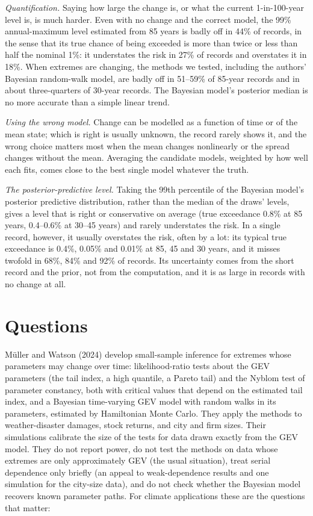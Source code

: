 \documentclass[11pt]{article}
\begin{document}
\emph{Quantification.} Saying how large the change is, or what the current 1-in-100-year level
is, is much harder. Even with no change and the correct model, the 99\% annual-maximum level
estimated from 85 years is badly off in 44\% of records, in the sense that its true chance of being
exceeded is more than twice or less than half the nominal 1\%: it understates the risk in 27\% of
records and overstates it in 18\%. When extremes are changing, the methods we tested, including the
authors' Bayesian random-walk model, are badly off in 51--59\% of 85-year records and in about
three-quarters of 30-year records. The Bayesian model's posterior median is no more accurate than a
simple linear trend.

\emph{Using the wrong model.} Change can be modelled as a function of time or of the mean state;
which is right is usually unknown, the record rarely shows it, and the wrong choice matters most
when the mean changes nonlinearly or the spread changes without the mean. Averaging the candidate
models, weighted by how well each fits, comes close to the best single model whatever the truth.

\emph{The posterior-predictive level.} Taking the 99th percentile of the Bayesian model's posterior
predictive distribution, rather than the median of the draws' levels, gives a level that is right or
conservative on average (true exceedance 0.8\% at 85 years, 0.4--0.6\% at 30--45 years) and rarely
understates the risk. In a single record, however, it usually overstates the risk, often by a lot:
its typical true exceedance is 0.4\%, 0.05\% and 0.01\% at 85, 45 and 30 years, and it misses
twofold in 68\%, 84\% and 92\% of records. Its uncertainty comes from the short record and the
prior, not from the computation, and it is as large in records with no change at all.

\setcounter{tocdepth}{1}
\tableofcontents
\newpage

\section{Questions}

M\"uller and Watson (2024) develop small-sample inference for extremes whose parameters may change
over time: likelihood-ratio tests about the GEV parameters (the tail index, a high quantile, a
Pareto tail) and the Nyblom test of parameter constancy, both with critical values that depend on
the estimated tail index, and a Bayesian time-varying GEV model with random walks in its
parameters, estimated by Hamiltonian Monte Carlo. They apply the methods to weather-disaster
damages, stock returns, and city and firm sizes. Their simulations calibrate the size of the tests
for data drawn exactly from the GEV model. They do not report power, do not test the methods on
data whose extremes are only approximately GEV (the usual situation), treat serial dependence only
briefly (an appeal to weak-dependence results and one simulation for the city-size data), and do
not check whether the Bayesian model recovers known parameter paths. For climate applications these are the questions that
matter:
\end{document}
